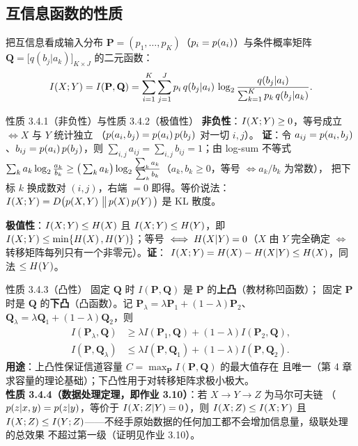 \subsection{互信息函数的性质}

把互信息看成输入分布 $\mathbf{P}=(p_1,\dots,p_K)$（$p_i=p\!\left(a_i\right)$）与条件概率矩阵
$\mathbf{Q}=\big[q(b_j|a_k)\big]_{K\times J}$ 的二元函数：
\[
I\!\left(X;Y\right)=I(\mathbf{P},\mathbf{Q})
=\sum_{i=1}^{K}\sum_{j=1}^{J}p_i\,q(b_j|a_i)\,
\log_{2}\frac{q(b_j|a_i)}{\sum_{k=1}^{K}p_k\,q(b_j|a_k)} .
\]

\begin{thmbox}{性质 3.4.1（非负性）与性质 3.4.2（极值性）}
\textbf{非负性}：$I\!\left(X;Y\right)\ge0$，等号成立 $\iff X$ 与 $Y$ 统计独立
（$p\!\left(a_i,b_j\right)=p\!\left(a_i\right)p\!\left(b_j\right)$ 对一切 $i,j$）。
\textbf{证}：令 $a_{ij}=p\!\left(a_i,b_j\right)$、$b_{ij}=p\!\left(a_i\right)p\!\left(b_j\right)$，则
$\sum_{i,j}a_{ij}=\sum_{i,j}b_{ij}=1$；由 log-sum 不等式
$\sum_{k}a_k\log_{2}\frac{a_k}{b_k}\ge\big(\sum_k a_k\big)\log_{2}
\frac{\sum_k a_k}{\sum_k b_k}$（$a_k,b_k\ge0$，等号 $\iff a_k/b_k$ 为常数），
把下标 $k$ 换成数对 $(i,j)$，右端 $=0$ 即得。等价说法：
$I\!\left(X;Y\right)=D\big(p\!\left(X,Y\right)\,\big\|\,p\!\left(X\right)p\!\left(Y\right)\big)$ 是 KL 散度。

\textbf{极值性}：$I\!\left(X;Y\right)\le H\!\left(X\right)$ 且 $I\!\left(X;Y\right)\le H\!\left(Y\right)$，即
$I\!\left(X;Y\right)\le\min\{H\!\left(X\right),H\!\left(Y\right)\}$；等号 $\iff H\!\left(X|Y\right)=0$（$X$ 由 $Y$ 完全确定
$\iff$ 转移矩阵每列只有一个非零元）。\textbf{证}：
$I\!\left(X;Y\right)=H\!\left(X\right)-H\!\left(X|Y\right)\le H\!\left(X\right)$，同法 $\le H\!\left(Y\right)$。
\end{thmbox}

\begin{thmbox}{性质 3.4.3（凸性）}
固定 $\mathbf{Q}$ 时 $I(\mathbf{P},\mathbf{Q})$ 是 $\mathbf{P}$ 的\textbf{上凸}（教材称凹函数）；
固定 $\mathbf{P}$ 时是 $\mathbf{Q}$ 的\textbf{下凸}（凸函数）。记
$\mathbf{P}_\lambda=\lambda\mathbf{P}_1+(1-\lambda)\mathbf{P}_2$、
$\mathbf{Q}_\lambda=\lambda\mathbf{Q}_1+(1-\lambda)\mathbf{Q}_2$，则
\begin{align*}
I(\mathbf{P}_\lambda,\mathbf{Q})&\ge\lambda I(\mathbf{P}_1,\mathbf{Q})
 +(1-\lambda)I(\mathbf{P}_2,\mathbf{Q}),\\
I(\mathbf{P},\mathbf{Q}_\lambda)&\le\lambda I(\mathbf{P},\mathbf{Q}_1)
 +(1-\lambda)I(\mathbf{P},\mathbf{Q}_2).
\end{align*}
\textbf{用途}：上凸性保证信道容量 $C=\max_{\mathbf{P}}I(\mathbf{P},\mathbf{Q})$ 的最大值存在
且唯一（第 4 章求容量的理论基础）；下凸性用于对转移矩阵求极小极大。\\[2pt]
\textbf{性质 3.4.4（数据处理定理，即作业 3.10）}：若 $X\to Y\to Z$ 为马尔可夫链
（$p\!\left(z|x,y\right)=p\!\left(z|y\right)$，等价于 $I\!\left(X;Z|Y\right)=0$），则 $I\!\left(X;Z\right)\le I\!\left(X;Y\right)$ 且
$I\!\left(X;Z\right)\le I\!\left(Y;Z\right)$——不经手原始数据的任何加工都不会增加信息量，级联处理的总效果
不超过第一级（证明见作业 3.10）。
\end{thmbox}

